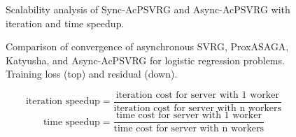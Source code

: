 \begin{figure}
%
%
%
\caption{Scalability analysis of Sync-AcPSVRG and Async-AcPSVRG with iteration and time speedup. }
\label{fig:FSVRG_speedup}
\end{figure}


\begin{figure}
%
%

%
%

\caption{Comparison of convergence of asynchronous SVRG, ProxASAGA, Katyusha, and Async-AcPSVRG for logistic regression problems. Training loss (top) and residual (down). }
\label{fig:algo_comp}
\end{figure}

\[
 \text{iteration speedup} = \frac{\text{iteration cost for server with 1 worker}}{\text{iteration cost for server with n workers}} \]
\vspace{0.5 pt}
\[
  \text{time speedup} = \frac{\text{time cost for server with 1 worker}}{\text{time cost for server with n workers}}
\]








